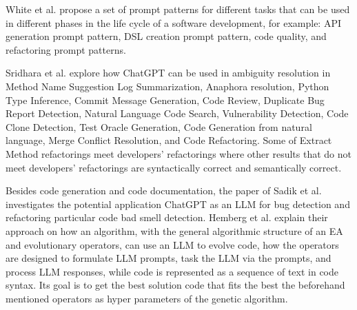  White et al. \cite{White2024} propose a set of prompt patterns for different tasks that can be used in different phases in the life cycle of a software development, for example: API generation prompt pattern, DSL creation prompt pattern, code quality, and refactoring prompt patterns.
  
Sridhara et al. \cite{sridhara2023chatgpt} explore how ChatGPT can be used in ambiguity resolution in Method Name Suggestion
   Log Summarization, Anaphora resolution, Python Type Inference,  Commit Message Generation, Code Review, Duplicate Bug Report Detection, Natural Language Code Search, Vulnerability Detection, Code Clone Detection, Test Oracle Generation, Code Generation from natural language, Merge Conflict Resolution, and Code Refactoring. Some of Extract Method refactorings meet developers' refactorings where other  results that do not meet developers' refactorings  are syntactically correct and semantically correct.

  Besides code generation and code documentation, the paper of Sadik et al. \cite{sadik2023analysis} investigates the potential application ChatGPT as an LLM for bug detection and refactoring particular code bad smell detection.
  Hemberg et al. \cite{hemberg2024evolving} explain their approach on how an algorithm, with the general algorithmic structure of an EA and evolutionary operators, can use an LLM to evolve code, how the operators are designed to formulate LLM prompts, task the LLM via the prompts, and process LLM responses, while code is represented as a sequence of text in code syntax. Its goal is to get the best solution code that fits the best the beforehand mentioned operators as hyper parameters of the genetic algorithm.



